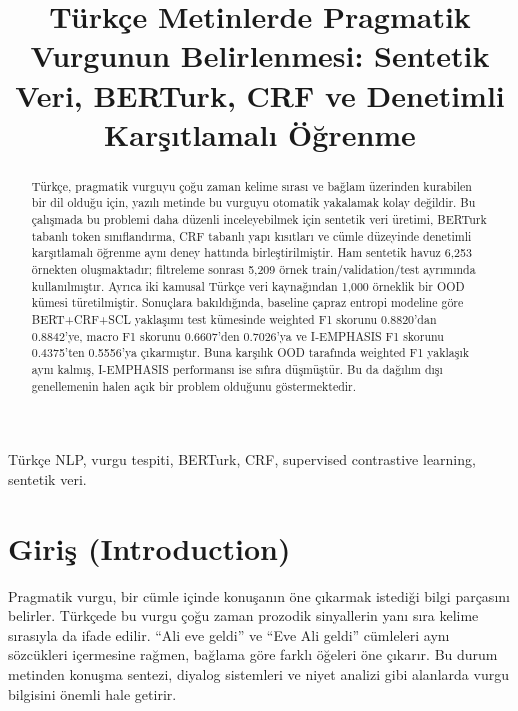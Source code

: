 \documentclass[conference]{IEEEtran}
\begin{document}
\title{Türkçe Metinlerde Pragmatik Vurgunun Belirlenmesi: Sentetik Veri, BERTurk, CRF ve Denetimli Karşıtlamalı Öğrenme}

\author{
}

\maketitle

\begin{abstract}
Türkçe, pragmatik vurguyu çoğu zaman kelime sırası ve bağlam üzerinden kurabilen bir dil olduğu için, yazılı metinde bu vurguyu otomatik yakalamak kolay değildir. Bu çalışmada bu problemi daha düzenli inceleyebilmek için sentetik veri üretimi, BERTurk tabanlı token sınıflandırma, CRF tabanlı yapı kısıtları ve cümle düzeyinde denetimli karşıtlamalı öğrenme aynı deney hattında birleştirilmiştir. Ham sentetik havuz 6{,}253 örnekten oluşmaktadır; filtreleme sonrası 5{,}209 örnek train/validation/test ayrımında kullanılmıştır. Ayrıca iki kamusal Türkçe veri kaynağından 1{,}000 örneklik bir OOD kümesi türetilmiştir. Sonuçlara bakıldığında, baseline çapraz entropi modeline göre BERT+CRF+SCL yaklaşımı test kümesinde weighted F1 skorunu 0.8820'dan 0.8842'ye, macro F1 skorunu 0.6607'den 0.7026'ya ve I-EMPHASIS F1 skorunu 0.4375'ten 0.5556'ya çıkarmıştır. Buna karşılık OOD tarafında weighted F1 yaklaşık aynı kalmış, I-EMPHASIS performansı ise sıfıra düşmüştür. Bu da dağılım dışı genellemenin halen açık bir problem olduğunu göstermektedir.
\end{abstract}

\begin{IEEEkeywords}
Türkçe NLP, vurgu tespiti, BERTurk, CRF, supervised contrastive learning, sentetik veri.
\end{IEEEkeywords}

\section{Giriş (Introduction)}
Pragmatik vurgu, bir cümle içinde konuşanın öne çıkarmak istediği bilgi parçasını belirler. Türkçede bu vurgu çoğu zaman prozodik sinyallerin yanı sıra kelime sırasıyla da ifade edilir. ``Ali eve geldi'' ve ``Eve Ali geldi'' cümleleri aynı sözcükleri içermesine rağmen, bağlama göre farklı öğeleri öne çıkarır. Bu durum metinden konuşma sentezi, diyalog sistemleri ve niyet analizi gibi alanlarda vurgu bilgisini önemli hale getirir.
\end{document}
